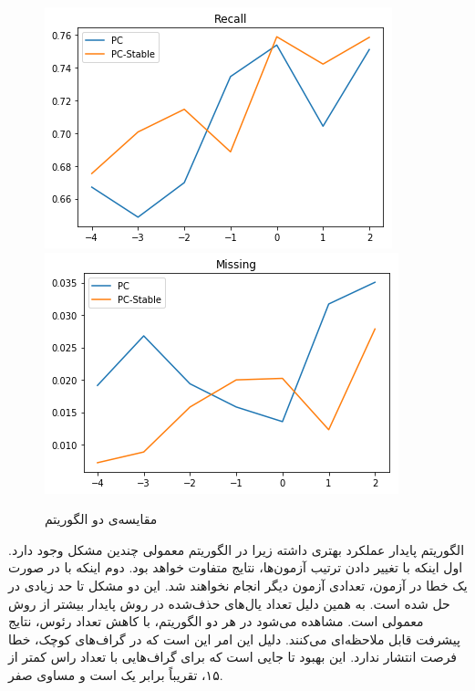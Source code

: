 \documentclass{article}
\begin{document}
\begin{figure}[h]
	\begin{floatrow}
		\centering
		\includegraphics[scale=0.451]{plt1.png}
		\includegraphics[scale=0.451]{plt2.png}
	\end{floatrow}
	\caption{مقایسه‌ی دو الگوریتم}
	\label{wait}
\end{figure}
الگوریتم پایدار عملکرد بهتری داشته زیرا در الگوریتم 
معمولی چندین مشکل وجود دارد. اول اینکه با تغییر دادن ترتیب آزمون‌ها، نتایج متفاوت خواهد بود. دوم اینکه با در صورت یک خطا در آزمون، تعدادی آزمون دیگر انجام نخواهند شد. این دو مشکل تا حد زیادی در 
حل شده است. به همین دلیل تعداد یال‌های حذف‌شده در روش پایدار بیشتر از روش معمولی است.
مشاهده می‌شود در هر دو الگوریتم، با کاهش تعداد رئوس، نتایج پیشرفت قابل ملاحظه‌ای می‌کنند. دلیل این امر این است که در گراف‌های کوچک، خطا فرصت انتشار ندارد. این بهبود تا جایی است که برای گراف‌هایی با تعداد راس کمتر از ۱۵، 
تقریباً برابر یک است و 
مساوی صفر.
\end{document}
